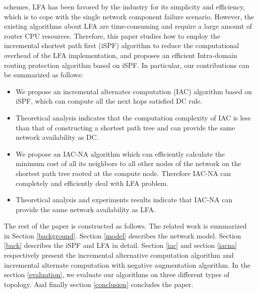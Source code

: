 schemes, LFA has been favored by the industry for its simplicity and efficiency, which is to cope with  the single network component failure scenario. However, the existing algorithms about LFA are time-consuming and require a large amount of router CPU resources. Therefore, this paper studies how to employ the incremental shortest path first (iSPF) algorithm to reduce the computational overhead of the LFA implementation, and proposes an efficient Intra-domain routing protection algorithm based on iSPF. In particular, our contributions can be summarized as follows:
\begin{itemize}
\item We propose an incremental alternates computation (IAC) algorithm based on iSPF, which can compute all the next hops satisfied DC rule. %
\item Theoretical analysis indicates that the computation complexity of IAC is less than that of constructing a shortest path tree and  can provide the same network availability as DC.
\item We propose an IAC-NA algorithm which can  efficiently calculate
the minimum cost of all its neighbors to all other nodes of the
network on the shortest path tree rooted at the compute node. Therefore
IAC-NA can completely and efficiently deal with LFA problem.
\item Theoretical analysis and experiments results indicate that IAC-NA can provide the same network availability as LFA.
\end{itemize}

The rest of the paper is constructed as follows. The related
work is summarized in Section \ref{background}.
Section \ref{model}  describes the network model.
Section \ref{back} describes the iSPF and LFA in detail.
Section \ref{iac} and section \ref{iacna} respectively present the incremental alternative computation algorithm and incremental alternate computation with negative augmentation algorithm.
In the section \ref{evaluation}, we evaluate our algorithms on three different types of topology.  And finally section \ref{conclusion} concludes the paper.




